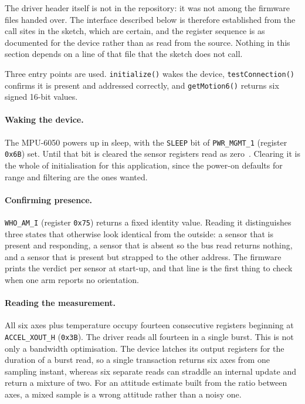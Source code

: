 The driver header itself is not in the repository: it was not among the
firmware files handed over. The interface described below is therefore
established from the call sites in the sketch, which are certain, and the
register sequence is as documented for the device rather than as read from
the source. Nothing in this section depends on a line of that file that the
sketch does not call.

Three entry points are used. \texttt{initialize()} wakes the device,
\texttt{testConnection()} confirms it is present and addressed correctly, and
\texttt{getMotion6()} returns six signed 16-bit values.

\paragraph{Waking the device.} The MPU-6050 powers up in sleep, with the
\texttt{SLEEP} bit of \texttt{PWR\_MGMT\_1} (register \texttt{0x6B}) set.
Until that bit is cleared the sensor registers read as
zero~\cite{invensense2013mpuregmap}. Clearing it is the whole of
initialisation for this application, since the power-on defaults for range and
filtering are the ones wanted.

\paragraph{Confirming presence.} \texttt{WHO\_AM\_I} (register \texttt{0x75})
returns a fixed identity value. Reading it distinguishes three states that
otherwise look identical from the outside: a sensor that is present and
responding, a sensor that is absent so the bus read returns nothing, and a
sensor that is present but strapped to the other address. The firmware prints
the verdict per sensor at start-up, and that line is the first thing to check
when one arm reports no orientation.

\paragraph{Reading the measurement.} All six axes plus temperature occupy
fourteen consecutive registers beginning at \texttt{ACCEL\_XOUT\_H}
(\texttt{0x3B}). The driver reads all fourteen in a single burst. This is not
only a bandwidth optimisation. The device latches its output registers for the
duration of a burst read, so a single transaction returns six axes from one
sampling instant, whereas six separate reads can straddle an internal update
and return a mixture of two. For an attitude estimate built from the ratio
between axes, a mixed sample is a wrong attitude rather than a noisy one.

